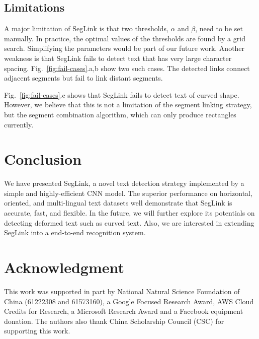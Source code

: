 \documentclass[10pt,twocolumn,letterpaper]{article}
\begin{document}
\subsection{Limitations}
A major limitation of SegLink is that two thresholds, $\alpha$ and $\beta$, need to be set manually.
In practice, the optimal values of the thresholds are found by a grid search.
Simplifying the parameters would be part of our future work.
Another weakness is that SegLink fails to detect text that has very large character spacing.
Fig.~\ref{fig:fail-cases}.a,b show two such cases.
The detected links connect adjacent segments but fail to link distant segments.

Fig.~\ref{fig:fail-cases}.c shows that SegLink fails to detect text of curved shape.
However, we believe that this is not a limitation of the segment linking strategy, but the segment combination algorithm, which can only produce rectangles currently.

\section{Conclusion}
We have presented SegLink, a novel text detection strategy implemented by a simple and highly-efficient CNN model.
The superior performance on horizontal, oriented, and multi-lingual text datasets well demonstrate that SegLink is accurate, fast, and flexible.
In the future, we will further explore its potentials on detecting deformed text such as curved text.
Also, we are interested in extending SegLink into a end-to-end recognition system.

\section*{Acknowledgment}

This work was supported in part by National Natural Science Foundation of China (61222308 and 61573160), a Google Focused Research Award, AWS Cloud Credits for Research, a Microsoft Research Award and a Facebook equipment donation. The authors also thank China Scholarship Council (CSC) for supporting this work.


{\small


}
\end{document}
